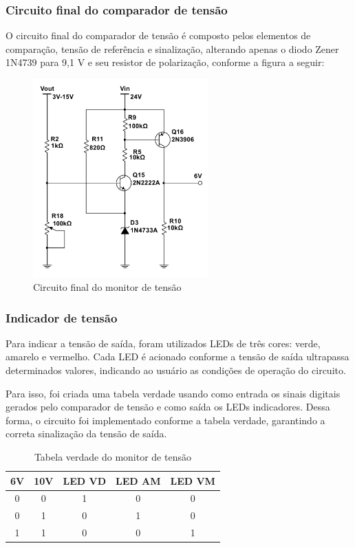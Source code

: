 \subsubsection*{Circuito final do comparador de tensão}

O circuito final do comparador de tensão é composto pelos elementos de comparação, tensão de referência e sinalização, alterando apenas o diodo Zener 1N4739 para 9,1 V e seu resistor de polarização, conforme a figura a seguir:

\begin{figure}[H]
    \centering
    \includegraphics[width=0.6\textwidth]{../imagens/circuito_comparador.png}
    \caption{Circuito final do monitor de tensão}
    \label{fig:monitor_tensao}
\end{figure}

\subsubsection*{Indicador de tensão}

Para indicar a tensão de saída, foram utilizados LEDs de três cores: verde, amarelo e vermelho. Cada LED é acionado conforme a tensão de saída ultrapassa determinados valores, indicando ao usuário as condições de operação do circuito.

Para isso, foi criada uma tabela verdade usando como entrada os sinais digitais gerados pelo comparador de tensão e como saída os LEDs indicadores. Dessa forma, o circuito foi implementado conforme a tabela verdade, garantindo a correta sinalização da tensão de saída.

\begin{table}[htbp]
    \centering
    \caption{Tabela verdade do monitor de tensão}
    \label{tab:exemplo}
    \begin{tabular}{|c|c|c|c|c|}
        \hline
        \textbf{6V} & \textbf{10V} & \textbf{LED VD} & \textbf{LED AM} & \textbf{LED VM} \\
        \hline
        0 & 0 & 1 & 0 & 0 \\
        0 & 1 & 0 & 1 & 0 \\
        1 & 1 & 0 & 0 & 1 \\
        \hline
    \end{tabular}
\end{table}

